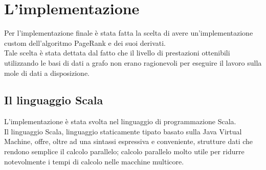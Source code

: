 \documentclass[a4paper, 12pt]{article}
\let\oldsection\section
\renewcommand\section{\clearpage\oldsection}
\begin{document}
\section{L'implementazione}
Per l'implementazione finale è stata fatta la scelta di avere un'implementazione custom dell'algoritmo PageRank e dei suoi derivati. \\
Tale scelta è stata dettata dal fatto che il livello di prestazioni ottenibili utilizzando le basi di dati a grafo non erano ragionevoli per eseguire il lavoro sulla mole di dati a disposizione.
\subsection{Il linguaggio Scala}
L'implementazione è stata svolta nel linguaggio di programmazione Scala. \\
Il linguaggio Scala, linguaggio staticamente tipato basato sulla Java Virtual Machine, offre, oltre ad una sintassi espressiva e conveniente, strutture dati che rendono semplice il calcolo parallelo; calcolo parallelo molto utile per ridurre notevolmente i tempi di calcolo nelle macchine multicore.
\end{document}

